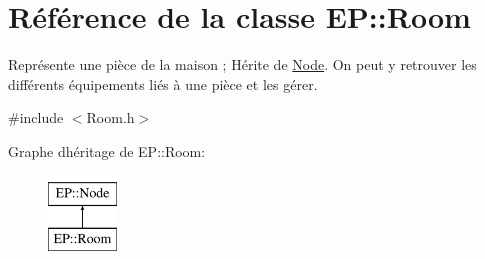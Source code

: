 \hypertarget{class_e_p_1_1_room}{}\section{Référence de la classe EP\+:\+:Room}
\label{class_e_p_1_1_room}


Représente une pièce de la maison ; Hérite de \hyperlink{class_e_p_1_1_node}{Node}. On peut y retrouver les différents équipements liés à une pièce et les gérer.  




{\ttfamily \#include $<$Room.\+h$>$}

Graphe d\textquotesingle{}héritage de EP\+:\+:Room\+:\begin{figure}[H]
\begin{center}
\leavevmode
\includegraphics[height=2.000000cm]{class_e_p_1_1_room}
\end{center}
\end{figure}
